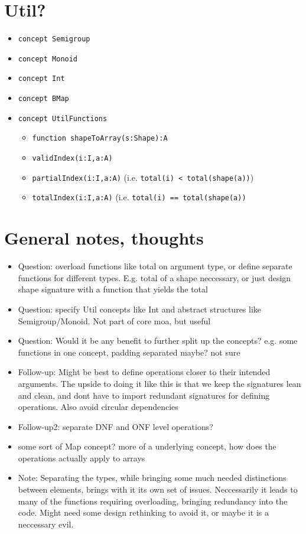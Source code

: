 \documentclass{article}
\begin{document}
\section{Util?}
\begin{itemize}
    \item \texttt{concept Semigroup}
    \item \texttt{concept Monoid}
    \item \texttt{concept Int}
    \item \texttt{concept BMap}
    \item \texttt{concept UtilFunctions}
    \begin{itemize}
        \item \texttt{function shapeToArray(s:Shape):A}
        \item \texttt{validIndex(i:I,a:A)}
        \item \texttt{partialIndex(i:I,a:A)} (i.e. \texttt{total(i) < total(shape(a))})
        \item \texttt{totalIndex(i:I,a:A)} (i.e. \texttt{total(i) == total(shape(a))}
    \end{itemize}
\end{itemize}

\section{General notes, thoughts}

\begin{itemize}
    \item Question: overload functions like total on argument type, or define separate functions for different types. E.g. total of a shape neccessary, or just design shape signature with a function that yields the total
    \item Question: specify Util concepts like Int and abstract structures like Semigroup/Monoid. Not part of core moa, but useful
    \item Question: Would it be any benefit to further split up the concepts? e.g. some functions in one concept, padding separated maybe? not sure
    \item Follow-up: Might be best to define operations closer to their intended arguments. The upside to doing it like this is that we keep the signatures lean and clean, and dont have to import redundant signatures for defining operations. Also avoid circular dependencies
    \item Follow-up2: separate DNF and ONF level operations?
    \item some sort of Map concept? more of a underlying concept, how does the operations actually apply to arrays
    \item Note: Separating the types, while bringing some much needed distinctions between elements, brings with it its own set of issues. Neccessarily it leads to many of the functions requiring overloading, bringing redundancy into the code. Might need some design rethinking to avoid it, or maybe it is a neccessary evil.
\end{itemize}
\end{document}
